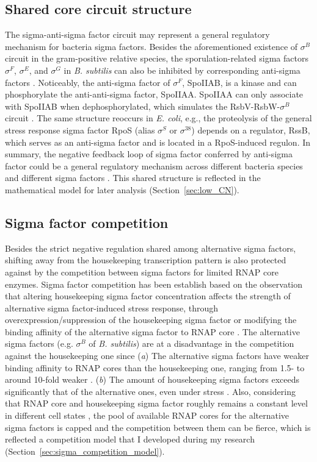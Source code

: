 \subsection{Shared core circuit structure}
\label{sec:shared_circuit_structure}

The sigma-anti-sigma factor circuit may represent a general
regulatory mechanism for bacteria sigma factors.
Besides the aforementioned existence of $\sigma^B$ circuit
in the gram-positive relative species,
the sporulation-related sigma factors $\sigma^F$, $\sigma^E$,
and $\sigma^G$ in \textit{B. subtilis} can also be
inhibited by corresponding anti-sigma factors \cite{martinez-lumbreras18}.
Noticeably, the anti-sigma factor of $\sigma^F$, SpoIIAB,
is a kinase and can phosphorylate the anti-anti-sigma factor,
SpoIIAA. SpoIIAA can only associate with SpoIIAB when
dephosphorylated, which simulates the RsbV-RsbW-$\sigma^B$
circuit \cite{haldenwang95}.
The same structure reoccurs in \textit{E. coli}, e.g.,
the proteolysis of the general stress response sigma factor
RpoS (alias $\sigma^S$ or $\sigma^{38}$) depends on
a regulator, RssB, which serves as an anti-sigma factor
and is located in a RpoS-induced regulon.
In summary, the negative feedback loop of sigma factor conferred
by anti-sigma factor could be a general regulatory mechanism
across different bacteria species and different sigma factors
\cite{trevino-quintanilla13}.
This shared structure is reflected in the mathematical 
model for later analysis (Section~\ref{sec:low_CN}).

\subsection{Sigma factor competition}
\label{sec:intro_sigma_competition}

Besides the strict negative regulation shared among
alternative sigma factors, shifting away from the
housekeeping transcription pattern is also protected
against by the competition between sigma factors
for limited RNAP core enzymes.
Sigma factor competition has been establish based on
the observation that altering housekeeping sigma factor
concentration affects the strength of alternative
sigma factor-induced stress response,
through overexpression/suppression of the housekeeping
sigma factor \cite{hicks96} or modifying the binding affinity of 
the alternative sigma factor to RNAP core \cite{zhou92a}.
The alternative sigma factors (e.g. $\sigma^B$ of \textit{B. subtilis})
are at a disadvantage in the competition against the housekeeping
one since
(\textit{a}) The alternative sigma factors have weaker binding affinity
to RNAP cores than the housekeeping one, ranging from
1.5- to around 10-fold weaker \cite{maeda00,ganguly12}.
(\textit{b}) The amount of housekeeping sigma factors exceeds
significantly that of the alternative ones, even under stress
\cite{osterberg11,jishage95}.
Also, considering that RNAP core and housekeeping sigma factor
roughly remains a constant level in different cell states \cite{osterberg11},
the pool of available RNAP cores for the alternative sigma factors
is capped and the competition between them can be fierce,
which is reflected a competition model that 
I developed during my research
(Section~\ref{sec:sigma_competition_model}).

